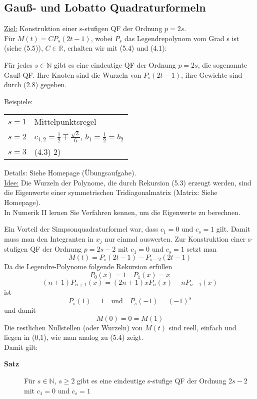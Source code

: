 \subsection{Gauß- und Lobatto Quadraturformeln}

\underline{Ziel:} Konstruktion einer s-stufigen QF der Ordnung $p=2s$.\\
Für $M(t) = CP_s(2t-1)$, wobei $P_s$ das Legendrepolynom vom Grad s ist (siehe (5.5)), $C \in \mathbb{R}$, erhalten wir mit (5.4) und (4.1):

\begin{theorem}
Für jedes $s \in \mathbb{N}$ gibt es eine eindeutige QF der Ordnung $p=2s$, die sogenannte Gauß-QF. Ihre Knoten sind die Wurzeln von $P_s(2t-1)$, ihre Gewichte sind durch (2.8) gegeben. 
\end{theorem}
\underline{Beispiele:} \\
\begin{tabular}{ll}
 
$s=1$ & Mittelpunktsregel \\

$s=2$ & $c_{1,2} = \frac{1}{2} \mp \frac{\sqrt{3}}{6}$, $b_1=\frac{1}{2} = b_2$ \\

$s=3$ & (4.3) 2) \\

\end{tabular}

\begin{nothing}
Details: Siehe Homepage (Übungsaufgabe). \\
\underline{Idee:} Die Wurzeln der Polynome, die durch Rekursion (5.3) erzeugt werden, sind die Eigenwerte einer symmetrischen Tridiagonalmatrix (Matrix: Siehe Homepage).\\
In Numerik II lernen Sie Verfahren kennen, um die Eigenwerte zu berechnen.
\end{nothing}

\begin{nothing}
Ein Vorteil der Simpsonquadraturformel war, dass $c_1=0$ und $c_s=1$ gilt. Damit muss man den Integranten in $x_j$ nur einmal auswerten. Zur Konstruktion einer s-stufigen QF der Ordnung $p=2s-2$ mit $c_1=0$ und $c_s=1$ setzt man 
$$M(t) = P_s(2t-1) - P_{s-2}(2t-1)$$
Da die Legendre-Polynome folgende Rekursion erfüllen
$$P_0(x)=1 \quad P_1(x) = x $$
$$ (n+1)P_{n+1}(x) = (2n+1)xP_n(x) - nP_{n-1}(x)$$
ist 
$$ P_s(1) = 1 \quad \text{und} \quad P_s(-1) = (-1)^s$$
und damit 
$$M(0) = 0 = M(1)$$
Die restlichen Nullstellen (oder Wurzeln) von $M(t)$ sind reell, einfach und liegen in (0,1), wie man analog zu (5.4) zeigt.\\
Damit gilt:
\begin{description}
  \item[\textbf{Satz}]
    Für $s \in \mathbb{N}$, $s \geq 2$ gibt es eine eindeutige s-stufige QF der Ordnung $2s-2$ mit $c_1=0$ und $c_s=1$
\end{description}
\end{nothing}